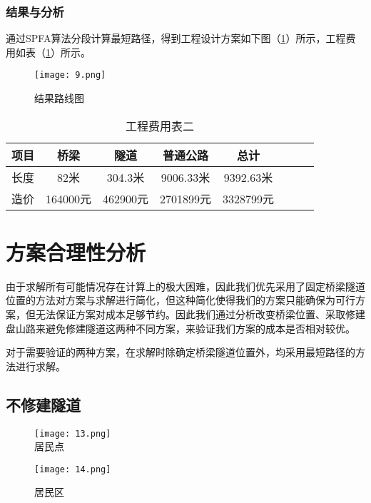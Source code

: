 \documentclass[bwprint]{cumcmthesis}
\begin{document}
\subsubsection{结果与分析}
通过SPFA算法分段计算最短路径，得到工程设计方案如下图（\ref{结果路线图2}）所示，工程费用如表（\ref{工程费用表二}）所示。

\begin{figure}[h]
\small
\centering
\texttt{[image: 9.png]}
\caption{结果路线图} 
\label{结果路线图2}
\end{figure}

\begin{table}[h]
\centering
\caption{工程费用表二}
\label{工程费用表二}
\begin{tabular}{|c|c|c|c|c|c|c|c|}
\hline
 项目 & 桥梁 & 隧道 & 普通公路 & 总计\\ \hline
长度    & 82米   & 304.3米  & 9006.33米 & 9392.63米 \\ \hline
造价    & 164000元 & 462900元 & 2701899元 &3328799元\\
\hline
\end{tabular}
\end{table}

\section{方案合理性分析}
由于求解所有可能情况存在计算上的极大困难，因此我们优先采用了固定桥梁隧道位置的方法对方案与求解进行简化，但这种简化使得我们的方案只能确保为可行方案，但无法保证方案对成本足够节约。因此我们通过分析改变桥梁位置、采取修建盘山路来避免修建隧道这两种不同方案，来验证我们方案的成本是否相对较优。

对于需要验证的两种方案，在求解时除确定桥梁隧道位置外，均采用最短路径的方法进行求解。

\subsection{不修建隧道}
\begin{figure}[h]  
\begin{minipage}[t]{0.5\textwidth}
\centering  
\texttt{[image: 13.png]} \\
\caption{居民点} \label{居民点2}
\end{minipage}
\hspace{1ex}
\begin{minipage}[t]{0.5\textwidth}  
\centering  
\texttt{[image: 14.png]}\\
\caption{居民区}  \label{居民区2}
\end{minipage}  
\end{figure} 
\end{document}
